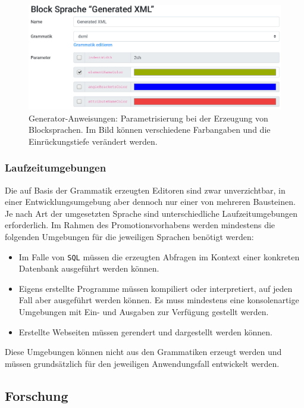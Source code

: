 \documentclass[paper=a4,fontsize=11pt,parskip=half]{scrartcl}
\begin{document}
\begin{figure}
  \centering\includegraphics[width=\linewidth]{screenshot-generation-parameters.png}
  \caption{Generator-Anweisungen: Parametrisierung bei der Erzeugung von Blocksprachen. Im Bild können verschiedene Farbangaben und die Einrückungstiefe verändert werden.}
  \label{fig:block-lang-generation-parameters}
\end{figure}

\subsubsection{Laufzeitumgebungen}

Die auf Basis der Grammatik erzeugten Editoren sind zwar unverzichtbar, in einer Entwicklungsumgebung aber dennoch nur einer von mehreren Bausteinen. Je nach Art der umgesetzten Sprache sind unterschiedliche Laufzeitumgebungen erforderlich. Im Rahmen des Promotionsvorhabens werden mindestens die folgenden Umgebungen für die jeweiligen Sprachen benötigt werden:

\begin{itemize}
\item Im Falle von \texttt{SQL} müssen die erzeugten Abfragen im Kontext einer konkreten Datenbank ausgeführt werden können.
\item Eigens erstellte Programme müssen kompiliert oder interpretiert, auf jeden Fall aber ausgeführt werden können. Es muss mindestens eine konsolenartige Umgebungen mit Ein- und Ausgaben zur Verfügung gestellt werden.
\item Erstellte Webseiten müssen gerendert und dargestellt werden können.
\end{itemize}

Diese Umgebungen können nicht aus den Grammatiken erzeugt werden und müssen grundsätzlich für den jeweiligen Anwendungsfall entwickelt werden.

\subsection{Forschung}
\end{document}
